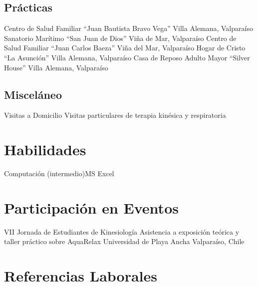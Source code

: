 \documentclass[11pt,a4paper,sans]{moderncv}
\begin{document}
\subsection{Prácticas}

\cventry{}
        {Centro de Salud Familiar ``Juan Bautista Bravo Vega''}
        {}
        {}
        {Villa Alemana, Valparaíso}
        {}
\cventry{}
        {Sanatorio Marítimo ``San Juan de Dios''}
        {}
        {}
        {Viña de Mar, Valparaíso}
        {}
\cventry{}
        {Centro de Salud Familiar ``Juan Carlos Baeza''}
        {}
        {}
        {Viña del Mar, Valparaíso}
        {}
\cventry{}
        {Hogar de Cristo ``La Asunción''}
        {}
        {}
        {Villa Alemana, Valparaíso}
        {}
\cventry{}
        {Casa de Reposo Adulto Mayor ``Silver House''}
        {}
        {}
        {Villa Alemana, Valparaíso}
        {}


\subsection{Misceláneo}


\cventry{}
        {Visitas a Domicilio}
        {Visitas particulares de terapia kinésica y respiratoria}
        {}
        {}
        {}

\section{Habilidades}
           {Computación (intermedio)}{MS Excel}

\section{Participación en Eventos}

        {VII Jornada de Estudiantes de Kinesiología}
        {Asistencia a exposición teórica y taller práctico sobre AquaRelax}
        {Universidad de Playa Ancha}
        {Valparaíso, Chile}
        {}

\section{Referencias Laborales}

\end{document}

